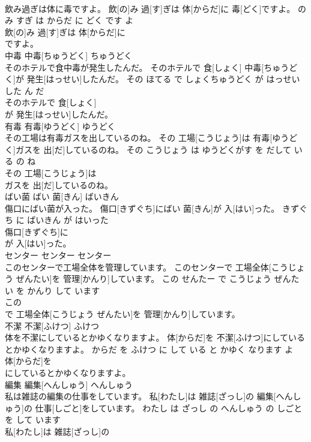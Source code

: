 \documentclass[8pt]{extreport}
\begin{document}
\begin{CJK}{UTF8}{min}
\\	飲み過ぎは体に毒ですよ。	飲[の]み 過[す]ぎは 体[からだ]に 毒[どく]ですよ。	のみ すぎ は からだ に どく です よ	
\\	飲[の]み 過[す]ぎは 体[からだ]に
\\	ですよ。			
\\	中毒	中毒[ちゅうどく]	ちゅうどく	
\\	そのホテルで食中毒が発生したんだ。	そのホテルで 食[しょく] 中毒[ちゅうどく]が 発生[はっせい]したんだ。	その ほてる で しょくちゅうどく が はっせい した ん だ	
\\	そのホテルで 食[しょく]
\\	が 発生[はっせい]したんだ。			
\\	有毒	有毒[ゆうどく]	ゆうどく	
\\	その工場は有毒ガスを出しているのね。	その 工場[こうじょう]は 有毒[ゆうどく]ガスを 出[だ]しているのね。	その こうじょう は ゆうどくがす を だして いる の ね	
\\	その 工場[こうじょう]は
\\	ガスを 出[だ]しているのね。			
\\	ばい菌	ばい 菌[きん]	ばいきん	
\\	傷口にばい菌が入った。	傷口[きずぐち]にばい 菌[きん]が 入[はい]った。	きずぐち に ばいきん が はいった	
\\	傷口[きずぐち]に
\\	が 入[はい]った。			
\\	センター	センター	センター	
\\	このセンターで工場全体を管理しています。	このセンターで 工場全体[こうじょう ぜんたい]を 管理[かんり]しています。	この せんたー で こうじょう ぜんたい を かんり して います	
\\	この
\\	で 工場全体[こうじょう ぜんたい]を 管理[かんり]しています。			
\\	不潔	不潔[ふけつ]	ふけつ	
\\	体を不潔にしているとかゆくなりますよ。	体[からだ]を 不潔[ふけつ]にしているとかゆくなりますよ。	からだ を ふけつ に して いる と かゆく なります よ	
\\	体[からだ]を
\\	にしているとかゆくなりますよ。			
\\	編集	編集[へんしゅう]	へんしゅう	
\\	私は雑誌の編集の仕事をしています。	私[わたし]は 雑誌[ざっし]の 編集[へんしゅう]の 仕事[しごと]をしています。	わたし は ざっし の へんしゅう の しごと を して います	
\\	私[わたし]は 雑誌[ざっし]の

\end{CJK}
\end{document}
